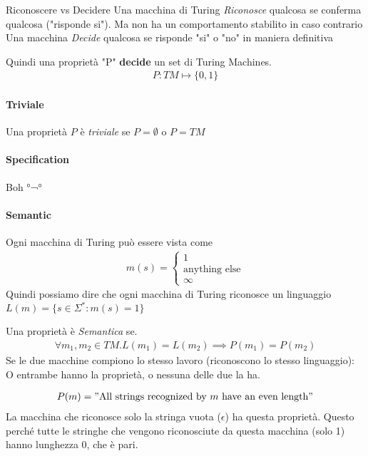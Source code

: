 \documentclass{article}
\begin{document}
\begin{callout}{Riconoscere vs Decidere}
    Una macchina di Turing \textit{Riconosce} qualcosa se conferma qualcosa ("risponde si"). Ma non ha un comportamento stabilito in caso contrario \\
    Una macchina \textit{Decide} qualcosa se risponde "si" o "no" in maniera definitiva
\end{callout}
Quindi una proprietà "P" \textbf{decide} un set di Turing Machines.
\begin{align*}
    P:TM\mapsto\{0,1\}
\end{align*}

\paragraph{Triviale}
Una proprietà $P$ è \textit{triviale} se $P=\emptyset$ o $P=TM$

\paragraph{Specification}
Boh °¬°

\paragraph{Semantic}
Ogni macchina di Turing può essere vista come
\begin{align*}
    m(s) = \begin{cases}
        1 \\
        \text{anything else} \\
        \infty
    \end{cases}
\end{align*}
Quindi possiamo dire che ogni macchina di Turing riconosce un linguaggio $L(m) = \{s\in\Sigma^*: m(s)=1\}$

Una proprietà è \textit{Semantica} se.
\begin{align*}
    \forall m_1,m_2\in TM. L(m_1)=L(m_2) \implies P(m_1)=P(m_2)
\end{align*}
Se le due macchine compiono lo stesso lavoro (riconoscono lo stesso linguaggio): O entrambe hanno la proprietà, o nessuna delle due la ha.

\begin{align*}
    P(m) = "\text{All strings recognized by $m$ have an even length}"
\end{align*}
La macchina che riconosce solo la stringa vuota ($\epsilon$) ha questa proprietà. Questo perché tutte le stringhe che vengono riconosciute da questa macchina (solo 1) hanno lunghezza $0$, che è pari.
\end{document}
